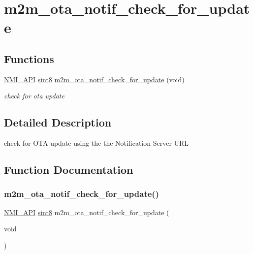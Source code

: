 \hypertarget{group__OtaNotifCheckFn}{}\section{m2m\+\_\+ota\+\_\+notif\+\_\+check\+\_\+for\+\_\+update}
\label{group__OtaNotifCheckFn}
\subsection*{Functions}
\begin{DoxyCompactItemize}
\item 
\hyperlink{group__BSPDefine_gaecc0323d771e41ef81a76b5f12783e22}{N\+M\+I\+\_\+\+A\+PI} \hyperlink{group__DataT_gae35f10ffd0ac8dd2bc3e794da9bdfbc7}{sint8} \hyperlink{group__OtaNotifCheckFn_ga522222363c6991cb078c38b06cfa6c80}{m2m\+\_\+ota\+\_\+notif\+\_\+check\+\_\+for\+\_\+update} (void)
\begin{DoxyCompactList}\small\item\em check for ota update \end{DoxyCompactList}\end{DoxyCompactItemize}


\subsection{Detailed Description}
check for O\+TA update using the the Notification Server U\+RL 

\subsection{Function Documentation}
\mbox{\label{group__OtaNotifCheckFn_ga522222363c6991cb078c38b06cfa6c80}} 
\subsubsection{\texorpdfstring{m2m\+\_\+ota\+\_\+notif\+\_\+check\+\_\+for\+\_\+update()}{m2m\_ota\_notif\_check\_for\_update()}}
{\footnotesize\ttfamily \hyperlink{group__BSPDefine_gaecc0323d771e41ef81a76b5f12783e22}{N\+M\+I\+\_\+\+A\+PI} \hyperlink{group__DataT_gae35f10ffd0ac8dd2bc3e794da9bdfbc7}{sint8} m2m\+\_\+ota\+\_\+notif\+\_\+check\+\_\+for\+\_\+update (\begin{DoxyParamCaption}\item[{void}]{ }\end{DoxyParamCaption})}



